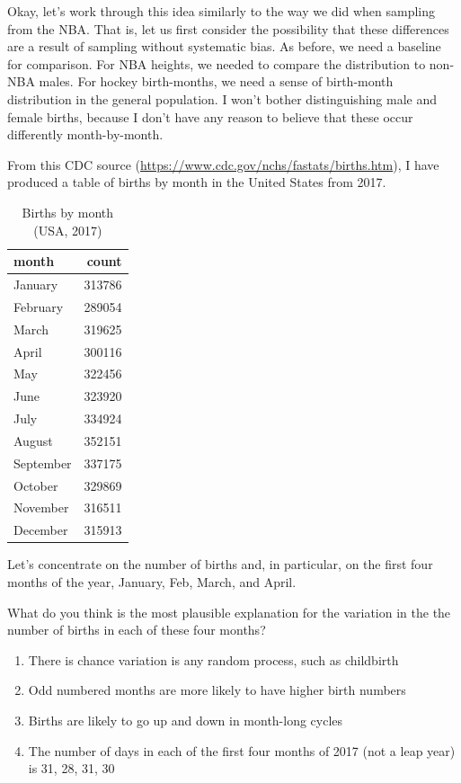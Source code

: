 \documentclass[openany]{book}
\providecommand{\tightlist}{%
  \setlength{\itemsep}{0pt}\setlength{\parskip}{0pt}}
\begin{document}
Okay, let's work through this idea similarly to the way we did when sampling from the NBA. That is, let us first consider the possibility that these differences are a result of sampling without systematic bias. As before, we need a baseline for comparison. For NBA heights, we needed to compare the distribution to non-NBA males. For hockey birth-months, we need a sense of birth-month distribution in the general population. I won't bother distinguishing male and female births, because I don't have any reason to believe that these occur differently month-by-month.

From this CDC source (\url{https://www.cdc.gov/nchs/fastats/births.htm}), I have produced a table of births by month in the United States from 2017.

\begin{table}[!h]

\caption{\label{tab:birthmonth-table}Births by month (USA, 2017)}
\centering
\begin{tabular}[t]{lr}
\toprule
month & count\\
\midrule
January & 313786\\
February & 289054\\
March & 319625\\
April & 300116\\
May & 322456\\
\addlinespace
June & 323920\\
July & 334924\\
August & 352151\\
September & 337175\\
October & 329869\\
\addlinespace
November & 316511\\
December & 315913\\
\bottomrule
\end{tabular}
\end{table}

Let's concentrate on the number of births and, in particular, on the first four months of the year, January, Feb, March, and April.

What do you think is the most plausible explanation for the variation in the the number of births in each of these four months?

\begin{enumerate}
\def\labelenumi{\alph{enumi}.}
\tightlist
\item
  There is chance variation is any random process, such as childbirth
\item
  Odd numbered months are more likely to have higher birth numbers
\item
  Births are likely to go up and down in month-long cycles
\item
  The number of days in each of the first four months of 2017 (not a leap year) is 31, 28, 31, 30
\end{enumerate}
\end{document}
